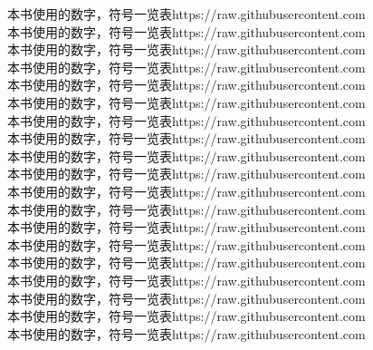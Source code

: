 {\cjk\mktsFontfileDejavusansmono{}本书使用的数字，符号一览表https://raw.githubusercontent.com}\\
{\cjk\mktsFontfileDejavuserifbold{}本书使用的数字，符号一览表https://raw.githubusercontent.com}\\
{\cjk\mktsFontfileDejavuserifbolditalic{}本书使用的数字，符号一览表https://raw.githubusercontent.com}\\
{\cjk\mktsFontfileDejavuserifitalic{}本书使用的数字，符号一览表https://raw.githubusercontent.com}\\
{\cjk\mktsFontfileDejavuserif{}本书使用的数字，符号一览表https://raw.githubusercontent.com}\\
{\cjk\mktsFontfileDejavuserifcondensedbold{}本书使用的数字，符号一览表https://raw.githubusercontent.com}\\
{\cjk\mktsFontfileDejavuserifcondensedbolditalic{}本书使用的数字，符号一览表https://raw.githubusercontent.com}\\
{\cjk\mktsFontfileDejavuserifcondenseditalic{}本书使用的数字，符号一览表https://raw.githubusercontent.com}\\
{\cjk\mktsFontfileDejavuserifcondensed{}本书使用的数字，符号一览表https://raw.githubusercontent.com}\\
{\cjk\mktsFontfileEbgaramondinitials{}本书使用的数字，符号一览表https://raw.githubusercontent.com}\\
{\cjk\mktsFontfileEbgaramondinitialsfone{}本书使用的数字，符号一览表https://raw.githubusercontent.com}\\
{\cjk\mktsFontfileEbgaramondinitialsftwo{}本书使用的数字，符号一览表https://raw.githubusercontent.com}\\
{\cjk\mktsFontfileEbgaramondeightitalic{}本书使用的数字，符号一览表https://raw.githubusercontent.com}\\
{\cjk\mktsFontfileEbgaramondeightregular{}本书使用的数字，符号一览表https://raw.githubusercontent.com}\\
{\cjk\mktsFontfileEbgaramondeightsc{}本书使用的数字，符号一览表https://raw.githubusercontent.com}\\
{\cjk\mktsFontfileEbgaramondtwelveallsc{}本书使用的数字，符号一览表https://raw.githubusercontent.com}\\
{\cjk\mktsFontfileEbgaramondtwelveitalic{}本书使用的数字，符号一览表https://raw.githubusercontent.com}\\
{\cjk\mktsFontfileEbgaramondtwelveregular{}本书使用的数字，符号一览表https://raw.githubusercontent.com}\\
{\cjk\mktsFontfileEbgaramondtwelvesc{}本书使用的数字，符号一览表https://raw.githubusercontent.com}\\
